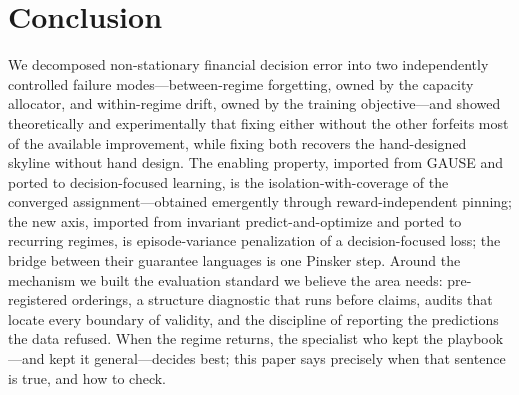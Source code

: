 \documentclass{article}
\begin{document}
\section{Conclusion}

We decomposed non-stationary financial decision error into two
independently controlled failure modes---between-regime forgetting, owned
by the capacity allocator, and within-regime drift, owned by the training
objective---and showed theoretically and experimentally that fixing either
without the other forfeits most of the available improvement, while
fixing both recovers the hand-designed skyline without hand design. The
enabling property, imported from GAUSE and ported to decision-focused
learning, is the isolation-with-coverage of the converged
assignment---obtained emergently through reward-independent pinning; the new
axis, imported from invariant predict-and-optimize and ported to recurring
regimes, is episode-variance penalization of a decision-focused loss; the
bridge between their guarantee languages is one Pinsker step. Around the
mechanism we built the evaluation standard we believe the area needs:
pre-registered orderings, a structure diagnostic that runs before claims,
audits that locate every boundary of validity, and the discipline of
reporting the predictions the data refused. When the regime returns, the
specialist who kept the playbook---and kept it general---decides best;
this paper says precisely when that sentence is true, and how to check.



\end{document}
